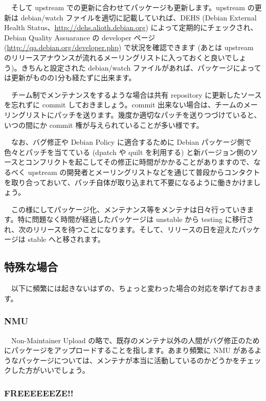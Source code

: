\documentclass[mingoth,a4paper]{jsarticle}
\begin{document}
　そして upstream での更新に合わせてパッケージも更新します。upstream の更新は debian/watch ファイルを適切に記載していれば、DEHS (Debian External Health Status、\url{http://dehs.alioth.debian.org}) によって定期的にチェックされ、Debian Quality Assuarance の developer ページ (\url{http://qa.debian.org/developer.php}) で状況を確認できます (あとは upstream のリリースアナウンスが流れるメーリングリストに入っておくと良いでしょう)。きちんと設定された debian/watch ファイルがあれば、パッケージによっては更新がものの1分も経たずに出来ます。

　チーム制でメンテナンスをするような場合は共有 repository に更新したソースを忘れずに commit しておきましょう。commit 出来ない場合は、チームのメーリングリストにパッチを送ります。幾度か適切なパッチを送りつづけていると、いつの間にか commit 権が与えられていることが多い様です。

　なお、バグ修正や Debian Policy に適合するために Debian パッケージ側で色々とパッチを当てている (dpatch や quilt を利用する) と新バージョン側のソースとコンフリクトを起こしてその修正に時間がかかることがありますので、なるべく upstream の開発者とメーリングリストなどを通じて普段からコンタクトを取り合っておいて、パッチ自体が取り込まれて不要になるように働きかけましょう。

　この様にしてパッケージ化、メンテナンス等をメンテナは日々行っていきます。特に問題なく時間が経過したパッケージは unstable から testing に移行され、次のリリースを待つことになります。そして、リリースの日を迎えたパッケージは stable へと移されます。


\subsection{特殊な場合}

　以下に頻繁には起きないはずの、ちょっと変わった場合の対応を挙げておきます。

\subsubsection{NMU}

　Non-Maintainer Upload の略で、既存のメンテナ以外の人間がバグ修正のためにパッケージをアップロードすることを指します。あまり頻繁に NMU があるようなパッケージについては、メンテナが本当に活動しているのかどうかをチェックした方がいいでしょう。

\subsubsection{FREEEEEEZE!!}
\end{document}
